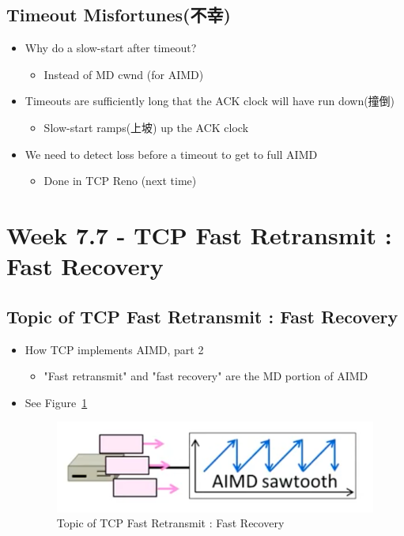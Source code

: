 \documentclass[12pt]{ctexart}   %
\begin{document}
	\subsection{Timeout Misfortunes(不幸)}
	\begin{itemize}
		\item Why do a slow-start after timeout?
		\begin{itemize}
			\item Instead of MD cwnd (for AIMD)
		\end{itemize}
		
		\item Timeouts are sufficiently long that the ACK clock will have run down(撞倒)
		\begin{itemize}
			\item Slow-start ramps(上坡) up the ACK clock
		\end{itemize}
		
		\item We need to detect loss before a timeout to get to full AIMD
		\begin{itemize}
			\item Done in TCP Reno (next time)
		\end{itemize}
	\end{itemize}
	
\section{Week 7.7 - TCP Fast Retransmit : Fast Recovery}	
	\subsection{Topic of TCP Fast Retransmit : Fast Recovery }
	\begin{itemize}
		\item How TCP implements AIMD, part 2
		\begin{itemize}
			\item "Fast retransmit" and "fast recovery" are the MD portion of AIMD
		\end{itemize}
		\item See Figure~\ref{fig:7-7-1}
		  
		 \begin{figure}[h!] %
		\centering
		 \includegraphics[scale=0.7]{images/7-7-1}
		\caption{ Topic of TCP Fast Retransmit : Fast Recovery }
		 \label{fig:7-7-1}
		 \end{figure}
	\end{itemize}
	
\end{document}
